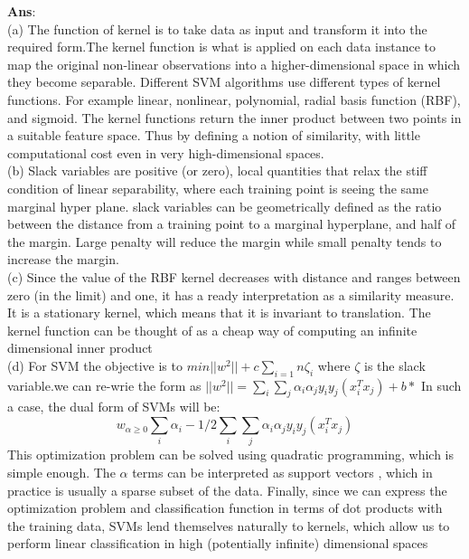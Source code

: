 \documentclass{article}
\begin{document}
\begin{enumerate}
\begin{enumerate}
\textbf{Ans}:\\

(a) The function of kernel is to take data as input and transform it into the required form.The kernel function is what is applied on each data instance to map the original non-linear observations into a higher-dimensional space in which they become separable. Different SVM algorithms use different types of kernel functions. For example linear, nonlinear, polynomial, radial basis function (RBF), and sigmoid. The kernel functions return the inner product between two points in a suitable feature space. Thus by defining a notion of similarity, with little computational cost even in very high-dimensional spaces. \\

(b) Slack variables are positive (or zero), local quantities that relax the stiff condition of linear separability, where each training point is seeing the same marginal hyper plane. slack variables can be geometrically defined as the ratio between the distance from a training point to a marginal hyperplane, and half of the margin. Large penalty will reduce the margin while small penalty tends to increase the margin. \\

(c) Since the value of the RBF kernel decreases with distance and ranges between zero (in the limit) and one, it has a ready interpretation as a similarity measure. It is a stationary kernel, which means that it is invariant to translation. The kernel function can be thought of as a cheap way of computing an infinite dimensional inner product \\

(d) For SVM the objective is to $min ||w^2||+c\sum_{i=1}{n}\zeta_i$ where $\zeta$ is the slack variable.we can re-wrie the form as $||w^2||=\sum_i\sum_j\alpha_i\alpha_jy_iy_j(x_i^Tx_j)+b*$ In such a case, the dual form of SVMs will be: 
$$
w_{\alpha \geq 0}\sum_i\alpha_i -1/2\sum_i\sum_j\alpha_i\alpha_jy_iy_j(x_i^Tx_j)
$$
This optimization problem can be solved using quadratic programming, which is simple enough. The $\alpha$ terms can be interpreted as support vectors , which in practice is usually a sparse subset of the data. Finally, since we can express the optimization problem and classification function in terms of dot products with the training data, SVMs lend themselves naturally to kernels, which allow us to perform linear classification in high (potentially infinite) dimensional spaces \\ 


\end{enumerate}
\end{enumerate}
\end{document}
